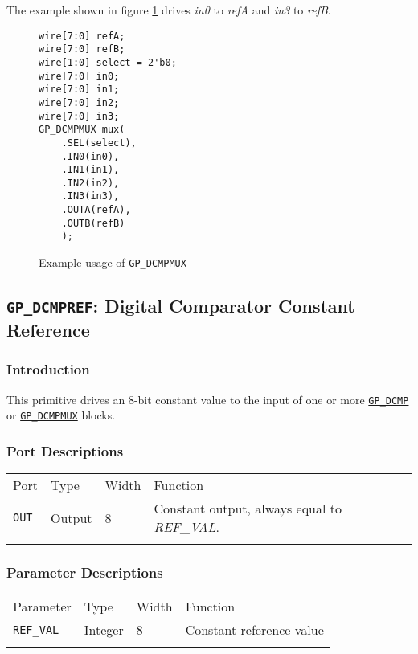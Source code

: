 \documentclass[11pt]{article}
\newcommand{\namestyle}[1]{\textit{#1}}
\newcommand{\tokenstyle}[1]{\texttt{#1}}
\newcommand{\whenstyle}[1]{{\fontseries{sb}\selectfont#1}}
\newcommand{\tokenref}[2]{\hyperref[#2]{\tokenstyle{#1}}}
\newcommand{\thinhline}{\Xhline{1\arrayrulewidth}}
\newcommand{\thickhline}{\Xhline{2.5\arrayrulewidth}}
\begin{document}
The example shown in figure \ref{gp-dcmpmux-example} drives \namestyle{in0} to \namestyle{refA} and \namestyle{in3} to
\namestyle{refB}.

\begin{figure}[h]
\begin{lstlisting}
wire[7:0] refA;
wire[7:0] refB;
wire[1:0] select = 2'b0;
wire[7:0] in0;
wire[7:0] in1;
wire[7:0] in2;
wire[7:0] in3;
GP_DCMPMUX mux(
	.SEL(select),
	.IN0(in0),
	.IN1(in1),
	.IN2(in2),
	.IN3(in3),
	.OUTA(refA),
	.OUTB(refB)
	);
\end{lstlisting}
\caption{Example usage of \tokenstyle{GP\_DCMPMUX}}
\label{gp-dcmpmux-example}
\end{figure}


\pagebreak
\subsection{\tokenstyle{GP\_DCMPREF}: Digital Comparator Constant Reference}
\label{gp-dcmpref}

\subsubsection{Introduction}

This primitive drives an 8-bit constant value to the input of one or more \tokenref{GP\_DCMP}{gp-dcmp} or
\tokenref{GP\_DCMPMUX}{gp-dcmpmux} blocks.

\subsubsection{Port Descriptions}

\begin{tabularx}{\textwidth}{lllX}
\thinhline
\whenstyle{Port} & \whenstyle{Type} & \whenstyle{Width} & \whenstyle{Function} \\
\thickhline
\tokenstyle{OUT} & Output & 8 & Constant output, always equal to \namestyle{REF\_VAL}. \\
\thinhline
\end{tabularx}

\subsubsection{Parameter Descriptions}

\begin{tabularx}{\textwidth}{lllX}
\thinhline
\whenstyle{Parameter} & \whenstyle{Type} & \whenstyle{Width} & \whenstyle{Function} \\
\thickhline
\tokenstyle{REF\_VAL} & Integer & 8 & Constant reference value \\
\thinhline
\end{tabularx}
\end{document}
